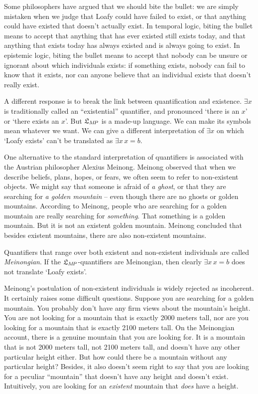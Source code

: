 Some philosophers have argued that we should bite the bullet: we are simply
mistaken when we judge that Loafy could have failed to exist, or that anything
could have existed that doesn't actually exist. In temporal logic, biting the
bullet means to accept that anything that has ever existed still exists today,
and that anything that exists today has always existed and is always going to
exist. In epistemic logic, biting the bullet means to accept that nobody can be
unsure or ignorant about which individuals exists: if something exists, nobody
can fail to know that it exists, nor can anyone believe that an individual
exists that doesn't really exist.


A different response is to break the link between quantification and
existence. $\exists x$ is traditionally called an ``existential'' quantifier,
and pronounced `there is an $x$' or `there exists an $x$'. But $\mathfrak{L}_{M\!P}$ is a
made-up language. We can make its symbols mean whatever we want. We can give a
different interpretation of $\exists x$ on which `Loafy exists' can't be
translated as $\exists x\, x\!=\!b$.

One alternative to the standard interpretation of quantifiers is associated with
the Austrian philosopher Alexius Meinong. Meinong observed that when we describe
beliefs, plans, hopes, or fears, we often seem to refer to non-existent objects.
We might say that someone is afraid of \emph{a ghost}, or that they are
searching for \emph{a golden mountain} -- even though there are no ghosts or
golden mountains. According to Meinong, people who are searching for a golden
mountain are really searching for \emph{something}. That something is a golden
mountain. But it is not an existent golden mountain. Meinong concluded that
besides existent mountains, there are also non-existent mountains.

Quantifiers that range over both existent and non-existent individuals are
called \emph{Meinongian}. If the $\mathfrak{L}_{M\!P}$-quantifiers are Meinongian, then
clearly $\exists x\, x\!=\!b$ does not translate `Loafy exists'.

Meinong's postulation of non-existent individuals is widely rejected as
incoherent. It certainly raises some difficult questions. Suppose you are
searching for a golden mountain. You probably don't have any firm views about
the mountain's height. You are not looking for a mountain that is exactly 2000
meters tall, nor are you looking for a mountain that is exactly 2100 meters
tall. On the Meinongian account, there is a genuine mountain that you
are looking for. It is a mountain that is not 2000 meters tall, not 2100 meters
tall, and doesn't have any other particular height either. But how could there
be a mountain without any particular height? Besides, it also doesn't seem right
to say that you are looking for a peculiar ``mountain'' that doesn't have any
height and doesn't exist. Intuitively, you are looking for an \emph{existent}
mountain that \emph{does} have a height.

